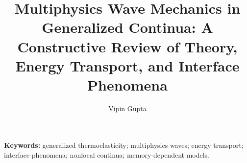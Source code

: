 \documentclass[11pt]{article}
\title{Multiphysics Wave Mechanics in Generalized Continua: A Constructive Review of Theory, Energy Transport, and Interface Phenomena}
\author{Vipin Gupta}
\date{}
\begin{document}
\maketitle
\begin{abstract}

\end{abstract}
\noindent\textbf{Keywords:} generalized thermoelasticity; multiphysics waves; energy transport; interface phenomena; nonlocal continua; memory-dependent models.




















\end{document}
